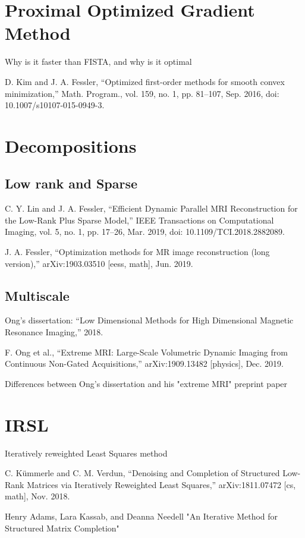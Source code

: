 \section{Proximal Optimized Gradient Method}
Why is it faster than FISTA, and why is it optimal

D. Kim and J. A. Fessler, “Optimized first-order methods for smooth convex minimization,” Math. Program., vol. 159, no. 1, pp. 81–107, Sep. 2016, doi: 10.1007/s10107-015-0949-3.

\section{Decompositions}

\subsection{Low rank and Sparse}
C. Y. Lin and J. A. Fessler, “Efficient Dynamic Parallel MRI Reconstruction for the Low-Rank Plus Sparse Model,” IEEE Transactions on Computational Imaging, vol. 5, no. 1, pp. 17–26, Mar. 2019, doi: 10.1109/TCI.2018.2882089.

J. A. Fessler, “Optimization methods for MR image reconstruction (long version),” arXiv:1903.03510 [eess, math], Jun. 2019.

\subsection{Multiscale}

Ong's dissertation: “Low Dimensional Methods for High Dimensional Magnetic Resonance Imaging,” 2018.

F. Ong et al., “Extreme MRI: Large-Scale Volumetric Dynamic Imaging from Continuous Non-Gated Acquisitions,” arXiv:1909.13482 [physics], Dec. 2019.

Differences between Ong's dissertation and his "extreme MRI" preprint paper

\section{IRSL}
Iteratively reweighted Least Squares method

C. Kümmerle and C. M. Verdun, “Denoising and Completion of Structured Low-Rank Matrices via Iteratively Reweighted Least Squares,” arXiv:1811.07472 [cs, math], Nov. 2018.

Henry Adams, Lara Kassab, and Deanna Needell "An Iterative Method for Structured Matrix Completion"

\clearpage %